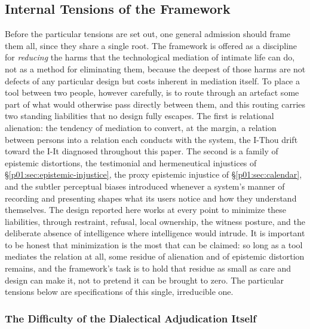 \documentclass[11pt,a4paper]{article}
\begin{document}
\subsection{Internal Tensions of the Framework}

Before the particular tensions are set out, one general admission should frame them all, since they share a single root. The framework is offered as a discipline for \emph{reducing} the harms that the technological mediation of intimate life can do, not as a method for eliminating them, because the deepest of those harms are not defects of any particular design but costs inherent in mediation itself. To place a tool between two people, however carefully, is to route through an artefact some part of what would otherwise pass directly between them, and this routing carries two standing liabilities that no design fully escapes. The first is relational alienation: the tendency of mediation to convert, at the margin, a relation between persons into a relation each conducts with the system, the I-Thou drift toward the I-It diagnosed throughout this paper. The second is a family of epistemic distortions, the testimonial and hermeneutical injustices of §\ref{p01:sec:epistemic-injustice}, the proxy epistemic injustice of §\ref{p01:sec:calendar}, and the subtler perceptual biases introduced whenever a system's manner of recording and presenting shapes what its users notice and how they understand themselves. The design reported here works at every point to minimize these liabilities, through restraint, refusal, local ownership, the witness posture, and the deliberate absence of intelligence where intelligence would intrude. It is important to be honest that minimization is the most that can be claimed: so long as a tool mediates the relation at all, some residue of alienation and of epistemic distortion remains, and the framework's task is to hold that residue as small as care and design can make it, not to pretend it can be brought to zero. The particular tensions below are specifications of this single, irreducible one.

\subsubsection{The Difficulty of the Dialectical Adjudication Itself}
\end{document}
